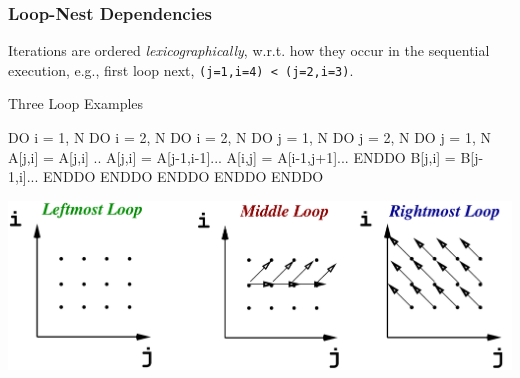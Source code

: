 \documentclass{beamer}
\begin{document}
\begin{frame}[fragile,t]
  \frametitle{Loop-Nest Dependencies} %

Iterations are ordered {\em lexicographically}, w.r.t. how they 
occur in the sequential execution, e.g., first loop next, 
{\tt(j=1,i=4) < (j=2,i=3)}.

\begin{block}{Three Loop Examples}
\begin{colorcode}
DO i = 1, N             DO i = 2, N                 DO i = 2, N
  DO j = 1, N             DO j = 2, N                 DO j = 1, N 
    A[j,i] = A[j,i] ..      A[j,i] = A[j-1,i-1]...        A[i,j] = A[i-1,j+1]...
  ENDDO                     B[j,i] = B[j-1,i]...      ENDDO
ENDDO                   ENDDO ENDDO                 ENDDO
\end{colorcode}
\end{block} 

\hspace{-3ex}\includegraphics[height=23ex]{ParTeaserFigs/LoopDeps}  

\end{frame}
\end{document}
